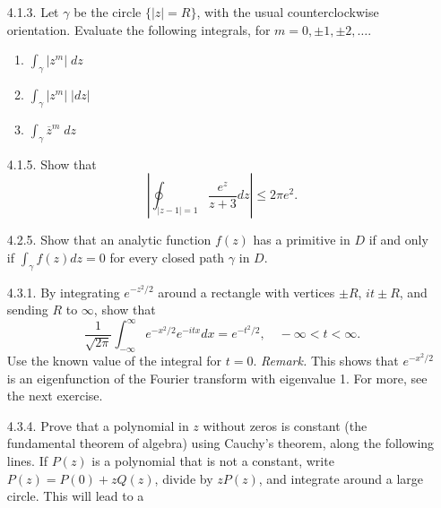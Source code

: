 \documentclass[9pt]{article}
\begin{document}
\begin{enumerate}
   \item[4.1.3.]  Let $\gamma$ be the circle $\{|z| = R\}$, with the usual
                  counterclockwise orientation. Evaluate the following
                  integrals, for $m = 0, \pm 1, \pm2, \ldots$.

                  \begin{enumerate}
                     \item $\int_\gamma |z^m|\;dz$
                     \item $\int_\gamma |z^m|\;|dz|$
                     \item $\int_\gamma \overline{z}^m\;dz$
                  \end{enumerate}
   \item[4.1.5.]  Show that
                  $$\left|\oint_{|z-1|=1}\frac{e^z}{z+3}dz\right|\le 2\pi e^2.$$
   \item[4.2.5.]  Show that an analytic function $f(z)$ has a primitive in $D$
                  if and only if $\int_\gamma f(z)dz = 0$ for every closed path
                  $\gamma$ in $D$.
   \item[4.3.1.]  By integrating $e^{-z^2/2}$ around a rectangle with vertices
                  $\pm R$, $it \pm R$, and sending $R$ to $\infty$, show that
                  $$\frac{1}{\sqrt{2\pi}}\int_{-\infty}^\infty e^{-x^2/2}
                    e^{-itx}dx = e^{-t^2/2}, \quad -\infty < t < \infty.$$
                  Use the known value of the integral for $t = 0$.
                  \textit{Remark.} This shows that $e^{-x^2/2}$ is an
                  eigenfunction of the Fourier transform with eigenvalue 1. For
                  more, see the next exercise.
   \item[4.3.4.]  Prove that a polynomial in $z$ without zeros is constant (the
                  fundamental theorem of algebra) using Cauchy's theorem, along
                  the following lines. If $P(z)$ is a polynomial that is not a
                  constant, write $P(z) = P(0) + zQ(z)$, divide by $zP(z)$, and
                  integrate around a large circle. This will lead to a

\end{enumerate}
\end{document}
